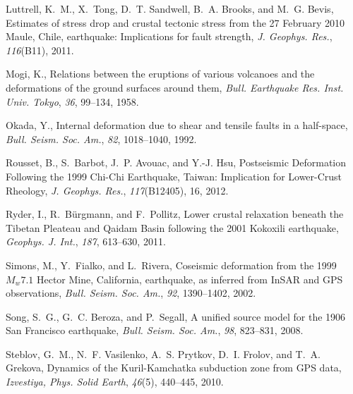 \documentclass[10pt]{article}
\begin{document}
\begin{thebibliography}{38}
Luttrell, K.~M., X.~Tong, D.~T. Sandwell, B.~A. Brooks, and M.~G. Bevis,
  {Estimates of stress drop and crustal tectonic stress from the 27 February
  2010 Maule, Chile, earthquake: Implications for fault strength}, \textit{J.
  Geophys. Res.}, \textit{116}(B11), 2011.

Mogi, K., Relations between the eruptions of various volcanoes and the
  deformations of the ground surfaces around them, \textit{Bull. Earthquake
  Res. Inst. Univ. Tokyo}, \textit{36}, 99--134, 1958.

Okada, Y., Internal deformation due to shear and tensile faults in a
  half-space, \textit{Bull. Seism. Soc. Am.}, \textit{82}, 1018--1040, 1992.

Rousset, B., S.~Barbot, J.~P. Avouac, and Y.-J. Hsu, {Postseismic Deformation
  Following the 1999 Chi-Chi Earthquake, Taiwan: Implication for Lower-Crust
  Rheology}, \textit{J. Geophys. Res.}, \textit{117}(B12405), 16, 2012.

Ryder, I., R.~B\"{u}rgmann, and F.~Pollitz, {Lower crustal relaxation beneath
  the Tibetan Pleateau and Qaidam Basin following the 2001 Kokoxili
  earthquake}, \textit{Geophys. J. Int.}, \textit{187}, 613--630, 2011.

Simons, M., Y.~Fialko, and L.~Rivera, {Coseismic deformation from the 1999
  $M_w7.1$ Hector Mine, California, earthquake, as inferred from InSAR and GPS
  observations}, \textit{Bull. Seism. Soc. Am.}, \textit{92}, 1390--1402, 2002.

Song, S.~G., G.~C. Beroza, and P.~Segall, {A unified source model for the 1906
  San Francisco earthquake}, \textit{Bull. Seism. Soc. Am.}, \textit{98},
  823--831, 2008.

Steblov, G.~M., N.~F. Vasilenko, A.~S. Prytkov, D.~I. Frolov, and T.~A.
  Grekova, {Dynamics of the Kuril-Kamchatka subduction zone from GPS data},
  \textit{Izvestiya, Phys. Solid Earth}, \textit{46}(5), 440--445, 2010.


\end{thebibliography}
\end{document}
